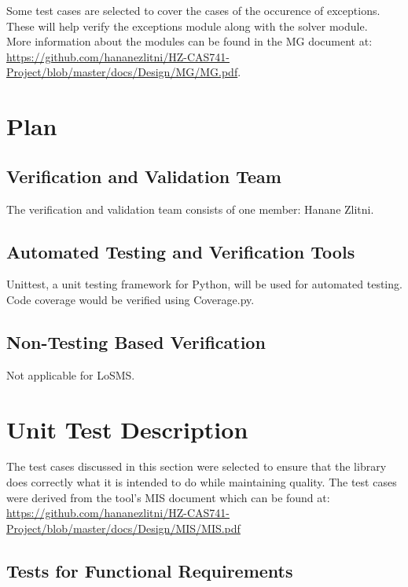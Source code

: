 \documentclass[12pt, titlepage]{article}
\newcommand{\famname}{LoSMS}
\begin{document}
Some test cases are selected to cover the cases of the occurence of exceptions. 
These will help verify the exceptions module along with the solver module. \\

More information about the modules can be found in the MG document at: 
\url{https://github.com/hananezlitni/HZ-CAS741-Project/blob/master/docs/Design/MG/MG.pdf}.


\section{Plan} \label{Plan}
	
\subsection{Verification and Validation Team}

The verification and validation team consists of one member: Hanane Zlitni.

\subsection{Automated Testing and Verification Tools}

Unittest, a unit testing framework for Python, will be used for automated 
testing. Code coverage would be verified using Coverage.py.

\subsection{Non-Testing Based Verification}

Not applicable for \famname{}.

\section{Unit Test Description} \label{UnitTestDescription}

The test cases discussed in this section were selected to ensure that the 
library does correctly what it is intended to do while maintaining quality. The 
test cases were derived from the tool's MIS document which can be found at: 
\url{https://github.com/hananezlitni/HZ-CAS741-Project/blob/master/docs/Design/MIS/MIS.pdf}

\subsection{Tests for Functional Requirements}
\end{document}
